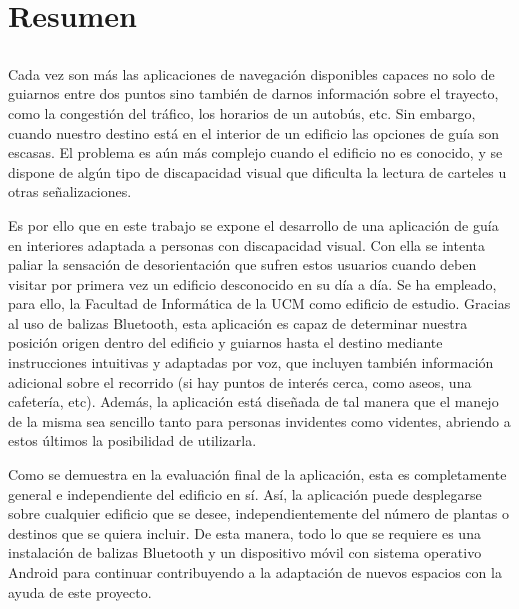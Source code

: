 \chapter*{Resumen}

\section*{}



Cada vez son más las aplicaciones de navegación disponibles capaces no solo de guiarnos entre dos puntos sino también de darnos información sobre el trayecto, como la congestión del tráfico, los horarios de un autobús, etc. Sin embargo, cuando nuestro destino está en el interior de un edificio las opciones de guía son escasas. El problema es aún más complejo cuando el edificio no es conocido, y se dispone de algún tipo de discapacidad visual que dificulta la lectura de carteles u otras señalizaciones.

Es por ello que en este trabajo se expone el desarrollo de una aplicación de guía en interiores adaptada a personas con discapacidad visual. Con ella se intenta paliar la sensación de desorientación que sufren estos usuarios cuando deben visitar por primera vez un edificio desconocido en su día a día. Se ha empleado, para ello, la Facultad de Informática de la UCM como edificio de estudio. Gracias al uso de balizas Bluetooth, esta aplicación es capaz de determinar nuestra posición origen dentro del edificio y guiarnos hasta el destino mediante instrucciones intuitivas y adaptadas por voz, que incluyen también información adicional sobre el recorrido (si hay puntos de interés cerca, como aseos, una cafetería, etc). Además, la aplicación está diseñada de tal manera que el manejo de la misma sea sencillo tanto para personas invidentes como videntes, abriendo a estos últimos la posibilidad de utilizarla.

Como se demuestra en la evaluación final de la aplicación, esta es completamente general e independiente del edificio en sí. Así, la aplicación puede desplegarse sobre cualquier edificio que se desee, independientemente del número de plantas o destinos que se quiera incluir.  De esta manera, todo lo que se requiere es una instalación de balizas Bluetooth y un dispositivo móvil con sistema operativo Android para continuar contribuyendo a la adaptación de nuevos espacios con la ayuda de este proyecto.

